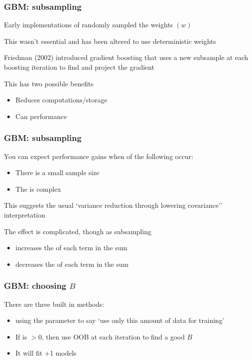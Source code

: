 \documentclass[12pt]{beamer}
\begin{document}
\begin{frame}[fragile]
\frametitle{GBM: subsampling}
Early implementations of  randomly sampled the weights $(w)$

\vsp
This wasn't essential and has been altered to use deterministic weights

\vsp
Friedman (2002) introduced  gradient boosting that uses a new subsample
at each boosting iteration to find and project the gradient

\vsp
This has two possible benefits
\begin{itemize}
\item Reduces computations/storage 

\item Can  performance
\end{itemize}
\end{frame}

\begin{frame}[fragile]
\frametitle{GBM: subsampling}
You can expect performance gains when  of the following occur:
\vsp

\begin{itemize}
\item There is a small sample size
\item The  is complex
\end{itemize}
\vsp

This suggests the usual `variance reduction through lowering covariance'' interpretation

\vsp
The effect is complicated, though as subsampling
\begin{itemize}
\item increases the  of each term in the sum
\item decreases the  of each term in the sum
\end{itemize}
\end{frame}

\begin{frame}[fragile]
\frametitle{GBM: choosing $B$}
There are three built in methods: 
\begin{itemize}
\item {} using the  parameter to say `use only
this amount of data for training'

\item  {} If  is $> 0$, then 
use  OOB at each iteration to find a good $B$

\item {}  It will fit +1 models

\end{itemize}
\end{frame}
\end{document}
